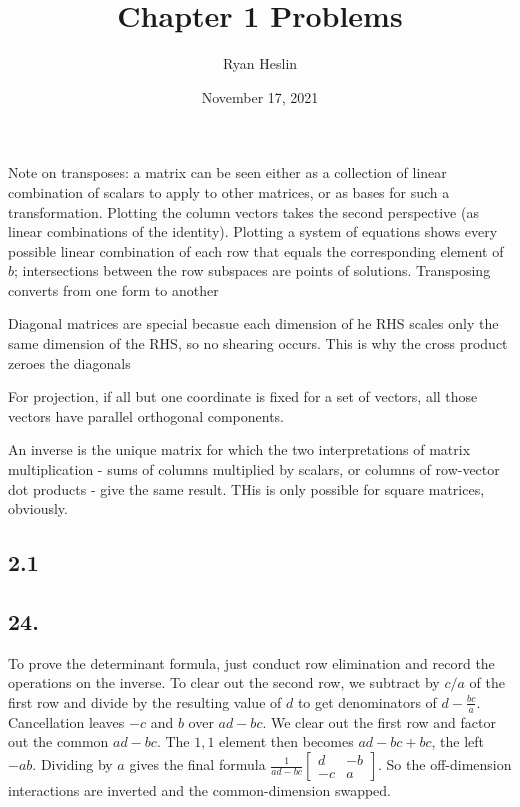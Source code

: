 \documentclass[]{article}
\title{Chapter 1 Problems}
\author{Ryan Heslin}
\date{November 17, 2021}
\newcommand{\m}[1]{\begin{bmatrix}#1\end{bmatrix}}
\begin{document}
\maketitle

Note on transposes: a matrix can be seen either as a collection of
linear combination of scalars to apply to other matrices, or as bases
for such a transformation. Plotting the column vectors takes the second
perspective (as linear combinations of the identity). Plotting a system
of equations shows every possible linear combination of each row that
equals the corresponding element of \(b\); intersections between the row
subspaces are points of solutions. Transposing converts from one form to
another

Diagonal matrices are special becasue each dimension of he RHS scales
only the same dimension of the RHS, so no shearing occurs. This is why
the cross product zeroes the diagonals

For projection, if all but one coordinate is fixed for a set of vectors,
all those vectors have parallel orthogonal components.

An inverse is the unique matrix for which the two interpretations of
matrix multiplication - sums of columns multiplied by scalars, or
columns of row-vector dot products - give the same result. THis is only
possible for square matrices, obviously.

\hypertarget{section}{%
\subsection{2.1}\label{section}}

\hypertarget{section-1}{%
\subsection{24.}\label{section-1}}

To prove the determinant formula, just conduct row elimination and
record the operations on the inverse. To clear out the second row, we
subtract by \(c/a\) of the first row and divide by the resulting value
of \(d\) to get denominators of \(d-\frac{bc}{a}\). Cancellation leaves
\(-c\) and \(b\) over \(ad-bc\). We clear out the first row and factor
out the common \(ad-bc\). The \(1,1\) element then becomes \(ad-bc+bc\),
the left \(-ab\). Dividing by \(a\) gives the final formula
\(\frac{1}{ad-bc}\m{d&-b\\-c&a}\). So the off-dimension interactions are
inverted and the common-dimension swapped.
\end{document}
